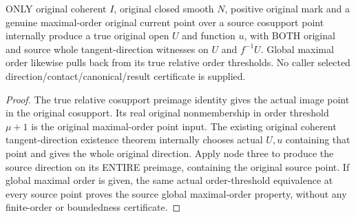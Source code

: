 \begin{theorem}
\label{hir:submersion-tangent-contact-original-joint-existence}
\leanok
ONLY original coherent $I$, original closed smooth $N$, positive original mark
and a genuine maximal-order original current point over a source cosupport
point internally produce a true original open $U$ and function $u$, with BOTH
original and source whole tangent-direction witnesses on $U$ and $f^{-1}U$.
Global maximal order likewise pulls back from its true relative order
thresholds. No caller selected direction/contact/canonical/result certificate
is supplied.
\end{theorem}
\begin{proof}
The true relative cosupport preimage identity gives the actual image point in
the original cosupport. Its real original nonmembership in order threshold
$\mu+1$ is the original maximal-order point input. The existing original
coherent tangent-direction existence theorem internally chooses actual $U,u$
containing that point and gives the whole original direction. Apply node
three to produce the source direction on its ENTIRE preimage, containing the
original source point. If global maximal order is given, the same actual
order-threshold equivalence at every source point proves the source global
maximal-order property, without any finite-order or boundedness certificate.
\end{proof}


